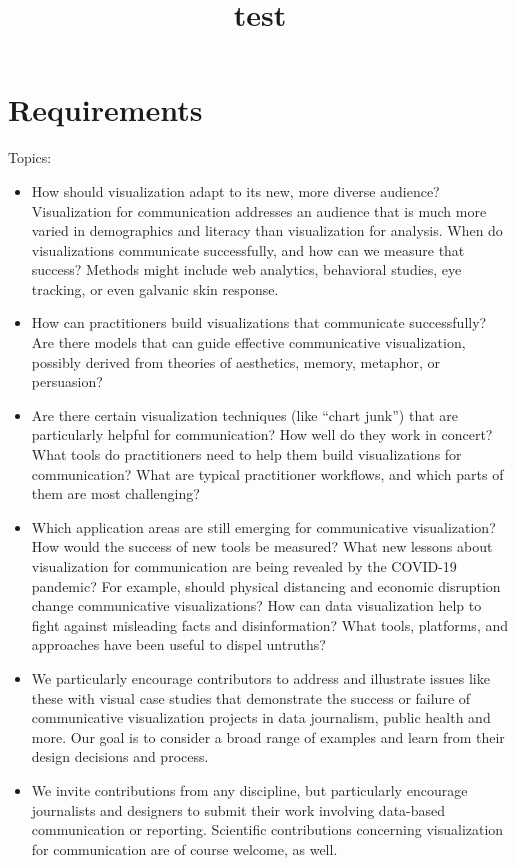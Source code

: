 \documentclass[
]{article}
\title{test}
\author{}
\date{\vspace{-2.5em}}
\begin{document}
\maketitle

\hypertarget{requirements}{%
\section{Requirements}\label{requirements}}

Topics:

\begin{itemize}
\item
  How should visualization adapt to its new, more diverse audience?
  Visualization for communication addresses an audience that is much
  more varied in demographics and literacy than visualization for
  analysis. When do visualizations communicate successfully, and how can
  we measure that success? Methods might include web analytics,
  behavioral studies, eye tracking, or even galvanic skin response.
\item
  How can practitioners build visualizations that communicate
  successfully? Are there models that can guide effective communicative
  visualization, possibly derived from theories of aesthetics, memory,
  metaphor, or persuasion?
\item
  Are there certain visualization techniques (like ``chart junk'') that
  are particularly helpful for communication? How well do they work in
  concert? What tools do practitioners need to help them build
  visualizations for communication? What are typical practitioner
  workflows, and which parts of them are most challenging?
\item
  Which application areas are still emerging for communicative
  visualization? How would the success of new tools be measured? What
  new lessons about visualization for communication are being revealed
  by the COVID-19 pandemic? For example, should physical distancing and
  economic disruption change communicative visualizations? How can data
  visualization help to fight against misleading facts and
  disinformation? What tools, platforms, and approaches have been useful
  to dispel untruths?
\item
  We particularly encourage contributors to address and illustrate
  issues like these with visual case studies that demonstrate the
  success or failure of communicative visualization projects in data
  journalism, public health and more. Our goal is to consider a broad
  range of examples and learn from their design decisions and process.
\item
  We invite contributions from any discipline, but particularly
  encourage journalists and designers to submit their work involving
  data-based communication or reporting. Scientific contributions
  concerning visualization for communication are of course welcome, as
  well.
\end{itemize}
\end{document}
